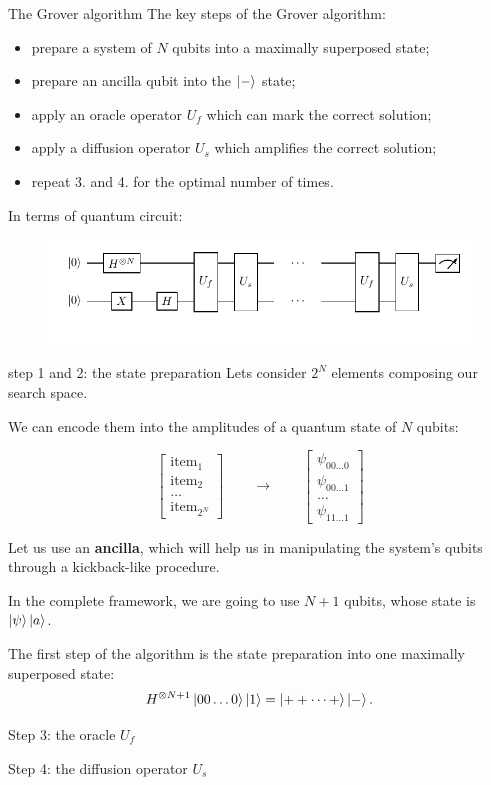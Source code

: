 \documentclass[aspectratio=169, 8pt, xcolor={svgnames}, hyperref={linkcolor=black}]{beamer}
\begin{document}
\begin{frame}{The Grover algorithm}
The key steps of the Grover algorithm:

\begin{itemize}[noitemsep]
\item[1.] prepare a system of $N$ qubits into a maximally superposed state;
\item[2.] prepare an ancilla qubit into the $\ket{-}$ state;
\item[3.] apply an oracle operator $U_f$ which can mark the correct solution;
\item[4.] apply a diffusion operator $U_s$ which amplifies the correct solution;
\item[5.] repeat 3. and 4. for the optimal number of times.
\end{itemize}
\pause

In terms of quantum circuit:
\begin{figure}
    \includegraphics[width=.9\textwidth]{figures/grover-circ.pdf}
\end{figure}
\end{frame}

\begin{frame}{step 1 and 2: the state preparation}
Lets consider $2^N$ elements composing our search space. \pause

We can encode them into the amplitudes of a quantum state of $N$ qubits: 

$$ 
\begin{bmatrix}
\text{item}_1 \\
\text{item}_2 \\
\dots \\
\text{item}_{2^N}
\end{bmatrix} \qquad \to \qquad 
\begin{bmatrix}
\psi_{00 \dots 0} \\
\psi_{00 \dots 1}  \\
\dots \\
\psi_{11 \dots 1}
\end{bmatrix}  
$$
\pause 

Let us use an \textbf{ancilla}, which will help us in manipulating 
the system's qubits through a kickback-like procedure.

In the complete framework, we are going to use $N+1$ qubits, whose state is $\ket{\psi}\ket{a}$.

The first step of the algorithm is the state preparation into one maximally superposed state:
$$ H^{\otimes N + 1} \ket{00\dots0}\ket{1} = \ket{++\dots+}\ket{-}. $$

\end{frame}

\begin{frame}{Step 3: the oracle $U_f$}

\end{frame}

\begin{frame}{Step 4: the diffusion operator $U_s$}

\end{frame}
\end{document}
